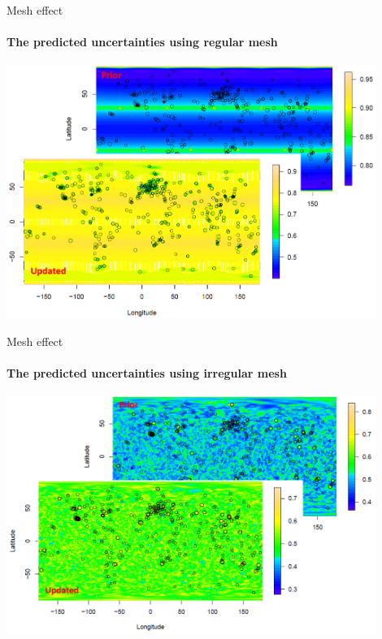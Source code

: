 \documentclass{beamer}
\begin{document}
\begin{frame}{Mesh effect}
\framesubtitle{The predicted uncertainties using regular mesh}

\vspace{0.7cm}
\centering
\includegraphics[width = 0.9\textwidth]{images/reg_var}
\end{frame}

\begin{frame}{Mesh effect }
\framesubtitle{The predicted uncertainties using irregular mesh}

\vspace{0.7cm}
\centering
\includegraphics[width = 0.9\textwidth]{images/irreg_var}
\end{frame}

\end{document}
